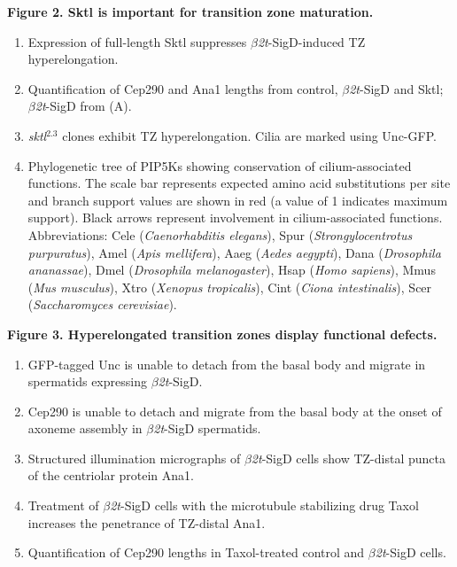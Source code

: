 \documentclass[12pt, twoside, letterpaper]{article}
\newcommand{\sigd}{$\beta$\textit{2t}-SigD}
\begin{document}
\begin{doublespacing}
\begin{linenumbers}
    \textbf{Figure 2. Sktl is important for transition zone maturation.}
    \begin{enumerate}[label={(\Alph*)}, nolistsep]
    \item Expression of full-length Sktl suppresses \sigd{}-induced TZ hyperelongation.
    \item Quantification of Cep290 and Ana1 lengths from control, \sigd{} and Sktl; \sigd{} from (A).
    \item \textit{sktl}$^{2.3}$ clones exhibit TZ hyperelongation. Cilia are marked using
      Unc-GFP.
    \item Phylogenetic tree of PIP5Ks showing conservation of cilium-associated functions.
      The scale bar represents expected amino acid substitutions per site and branch support values are shown in red (a value of 1 indicates maximum support).
      Black arrows represent involvement in cilium-associated functions.
      Abbreviations: Cele (\textit{Caenorhabditis elegans}), Spur (\textit{Strongylocentrotus purpuratus}), Amel (\textit{Apis mellifera}), Aaeg (\textit{Aedes aegypti}), Dana (\textit{Drosophila ananassae}), Dmel (\textit{Drosophila melanogaster}), Hsap (\textit{Homo sapiens}), Mmus (\textit{Mus musculus}), Xtro (\textit{Xenopus tropicalis}), Cint (\textit{Ciona intestinalis}), Scer (\textit{Saccharomyces cerevisiae}).
    \end{enumerate}
    
    
    \textbf{Figure 3. Hyperelongated transition zones display functional defects.}
    \begin{enumerate}[label={(\Alph*)}, nolistsep]
    \item GFP-tagged Unc is unable to detach from the basal body and migrate in spermatids expressing \sigd{}.
    \item Cep290 is unable to detach and migrate from the basal body at the onset of axoneme assembly in \sigd{} spermatids.
    \item Structured illumination micrographs of \sigd{} cells show TZ-distal puncta of the centriolar protein Ana1.
    \item Treatment of \sigd{} cells with the microtubule stabilizing drug Taxol increases the penetrance of TZ-distal Ana1.
    \item Quantification of Cep290 lengths in Taxol-treated control and \sigd{} cells.
    \end{enumerate}



\end{linenumbers}
\end{doublespacing}
\end{document}
